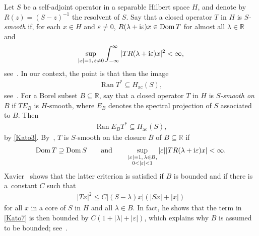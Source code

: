 \documentclass[10pt,a4paper]{amsart}
\numberwithin{equation}{section}
\DeclareMathOperator{\dom}{Dom}
\DeclareMathOperator{\ran}{Ran}
\def\ac{\mathrm{ac}}
\def\R{\mathbb R}
\def\ve{\varepsilon}
\begin{document}
Let $S$ be a self-adjoint operator in a separable Hilbert space $H$,
and denote by $R(z)=(S-z)^{-1}$ the resolvent of $S$.
Say that a closed operator $T$ in $H$ is \emph{$S$-smooth} if, for each $x\in H$ and $\ve\ne0$,
$R(\lambda+{\rm i}\ve)x\in\dom T$
 for almost all $\lambda\in\R$ and
\begin{align*}%
 \sup_{|x|=1,\,\ve\ne0} \int_{-\infty}^\infty |TR(\lambda+{\rm i}\ve)x|^2 < \infty,
\end{align*}
see~\cite[p.~142]{ReedSimon78}.
In our context, the point is that then the image
\begin{align}\label{Kato3}
 \ran T^* \subseteq H_{\ac}(S),
\end{align}
see~\cite[Theorem XIII.23]{ReedSimon78}.
For a Borel subset $B\subseteq\R$,
say that a closed operator $T$ in $H$ is \emph{$S$-smooth on $B$} if $TE_B$ is $H$-smooth,
where $E_B$ denotes the spectral projection of $S$ associated to $B$.
Then
\begin{align*}%
 \ran E_BT^* \subseteq H_{\ac}(S),
\end{align*}
by \eqref{Kato3}.
By~\cite[Theorem XIII.30]{ReedSimon78}, $T$ is $S$-smooth on the closure $\bar B$ of $B\subseteq\R$ if
\begin{align}\label{Kato7}
 \dom T\supseteq\dom S
 \qquad\text{and}\qquad
 \sup_{\substack{|x|=1, \, \lambda\in B,\\ 0<|\ve|<1}} |\ve||TR(\lambda+{\rm i}\ve)x| < \infty.
\end{align}
Xavier~\cite[p.~581f.]{Xavier1988} shows that the latter criterion is satisfied
if $B$ is bounded and if there is a~constant $C$ such that
\begin{align}\label{Kato9}
 |Tx|^2 \le C|(S-\lambda)x|(|Sx|+|x|)
\end{align}
for all $x$ in a core of $S$ in $H$ and all $\lambda\in B$.
In fact, he shows that the term in \eqref{Kato7} is then bounded by $C(1+|\lambda|+|\ve|)$,
which explains why $B$ is assumed to be bounded; see~\cite[top of~p.~582]{Xavier1988}.
\end{document}
